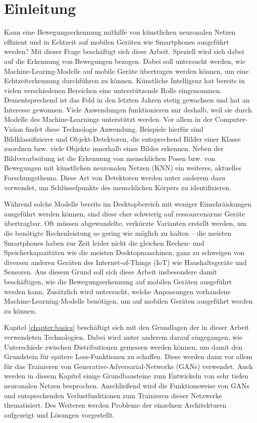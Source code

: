 \chapter{Einleitung}
Kann eine Bewegungserkennung mithilfe von künstlichen neuronalen Netzen
effizient und in Echtzeit auf mobilen Geräten wie Smartphones ausgeführt
werden? Mit dieser Frage beschäftigt sich diese Arbeit. Speziell wird
sich dabei auf die Erkennung von Bewegungen bezogen. Dabei soll untersucht
werden, wie Machine-Learing-Modelle auf mobile Geräte übertragen werden können,
um eine Echtzeiterkennung durchführen zu können. Künstliche Intelligenz hat
bereits in vielen verschiedenen Bereichen eine unterstützende Rolle
eingenommen.  Dementsprechend ist das Feld in den letzten Jahren stetig
gewachsen und hat an Interesse gewonnen. Viele Anwendungen funktionieren nur
deshalb, weil sie durch Modelle des Machine-Learnings unterstützt werden. Vor
allem in der Computer-Vision findet diese Technologie Anwendung. Beispiele
hierfür sind Bildklassifizierer und Objekt-Detektoren, die entsprechend Bilder
einer Klasse zuordnen bzw. viele Objekte innerhalb eines Bildes erkennen. Neben
der Bildverarbeitung ist die Erkennung von menschlichen Posen bzw. von
Bewegungen mit künstlichen neuronalen Netzen (KNN) ein weiteres, aktuelles
Forschungsthema. Diese Art von Detektoren werden unter anderem dazu verwendet,
um Schlüs\-sel\-punkte des menschlichen Körpers zu identifizieren.

Während solche Modelle bereits im Desktopbereich mit weniger Einschränkungen
ausgeführt werden können, sind diese eher schwierig auf ressourcenarme Geräte
übertragbar. Oft müssen abgewandelte, verkürzte Varianten erstellt werden, um
die benötigte Rechenleistung so gering wie möglich zu halten -- die meisten
Smartphones haben zur Zeit leider nicht die gleichen Rechen- und
Speicherkapazitäten wie die meisten Desktopmaschinen, ganz zu schweigen von
diversen anderen Geräten des Internet-of-Things (IoT) wie Haushaltsgeräte und
Sensoren. Aus diesem Grund soll sich diese Arbeit insbesondere damit
beschäftigen, wie die Bewegungserkennung auf mobilen Geräten ausgeführt werden
kann. Zusätzlich wird untersucht, welche Anpassungen vorhandene
Machine-Learning-Modelle benötigen, um auf mobilen Geräten ausgeführt werden zu
können.

Kapitel \ref{chapter:basics} beschäftigt sich mit den Grundlagen der in dieser
Arbeit verwendeten Technologien. Dabei wird unter anderem darauf eingegangen,
wie Unterschiede zwischen Distributionen gemessen werden können, um damit den
Grundstein für spätere Loss-Funktionen zu schaffen. Diese werden dann vor allem
für das Trainieren von Generative-Adversarial-Networks (GANs) verwendet. Auch
werden in diesem Kapitel einige Grundbausteine zum Entwickeln von sehr tiefen
neuronalen Netzen besprochen. Anschließend wird die Funktionsweise von GANs und
entsprechenden Verlustfunktionen zum Trainieren dieser Netzwerke thematisiert.
Des Weiteren werden Probleme der einzelnen Architekturen aufgezeigt und Lösungen
vorgestellt.

